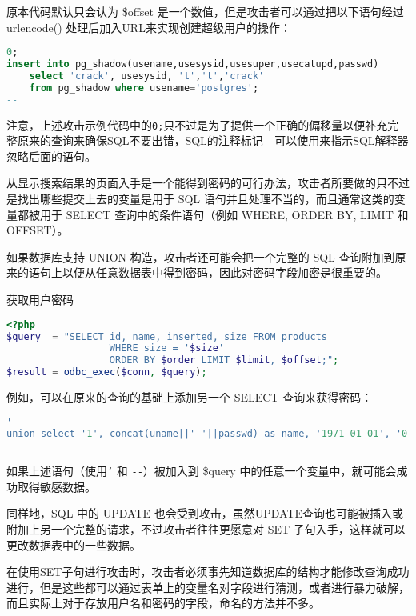 原本代码默认只会认为 \$offset 是一个数值，但是攻击者可以通过把以下语句经过 urlencode() 处理后加入URL来实现创建超级用户的操作：

\begin{lstlisting}[language=SQL]
0;
insert into pg_shadow(usename,usesysid,usesuper,usecatupd,passwd)
    select 'crack', usesysid, 't','t','crack'
    from pg_shadow where usename='postgres';
--
\end{lstlisting}



注意，上述攻击示例代码中的\texttt{0;}只不过是为了提供一个正确的偏移量以便补充完整原来的查询来确保SQL不要出错，SQL的注释标记\texttt{-\/-}可以使用来指示SQL解释器忽略后面的语句。


从显示搜索结果的页面入手是一个能得到密码的可行办法，攻击者所要做的只不过是找出哪些提交上去的变量是用于 SQL 语句并且处理不当的，而且通常这类的变量都被用于 SELECT 查询中的条件语句（例如 WHERE, ORDER BY, LIMIT 和 OFFSET）。

如果数据库支持 UNION 构造，攻击者还可能会把一个完整的 SQL 查询附加到原来的语句上以便从任意数据表中得到密码，因此对密码字段加密是很重要的。

\begin{example}
获取用户密码
\begin{lstlisting}[language=PHP]
<?php
$query  = "SELECT id, name, inserted, size FROM products
                  WHERE size = '$size'
                  ORDER BY $order LIMIT $limit, $offset;";
$result = odbc_exec($conn, $query);
\end{lstlisting}
\end{example}

例如，可以在原来的查询的基础上添加另一个 SELECT 查询来获得密码：


\begin{lstlisting}[language=SQL]
'
union select '1', concat(uname||'-'||passwd) as name, '1971-01-01', '0' from usertable;
--
\end{lstlisting}


如果上述语句（使用\texttt{'} 和 \texttt{-\/-}）被加入到 \$query 中的任意一个变量中，就可能会成功取得敏感数据。

同样地，SQL 中的 UPDATE 也会受到攻击，虽然UPDATE查询也可能被插入或附加上另一个完整的请求，不过攻击者往往更愿意对 SET 子句入手，这样就可以更改数据表中的一些数据。

在使用SET子句进行攻击时，攻击者必须事先知道数据库的结构才能修改查询成功进行，但是这些都可以通过表单上的变量名对字段进行猜测，或者进行暴力破解，而且实际上对于存放用户名和密码的字段，命名的方法并不多。

